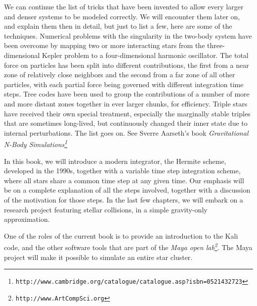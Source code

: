\documentclass{book}
\begin{document}
We can continue the list of tricks that have been invented to allow
every larger and denser systems to be modeled correctly.  We will
encounter them later on, and explain them then in detail, but just to
list a few, here are some of the techniques.  Numerical problems with
the singularity in the two-body system have been overcome by mapping
two or more interacting stars from the three-dimensional Kepler
problem to a four-dimensional harmonic oscillator.  The total force on
particles has been split into different contributions, the first from
a near zone of relatively close neighbors and the second from a far
zone of all other particles, with each partial force being governed
with different integration time steps.  Tree codes have been used to
group the contributions of a number of more and more distant zones
together in ever larger chunks, for efficiency.  Triple stars have
received their own special treatment, especially the marginally stable
triples that are sometimes long-lived, but continuously changed their
inner state due to internal perturbations.  The list goes on.  See
Sverre Aarseth's book
 {\it Gravitational
N-Body Simulations\footnote{\tt http://www.cambridge.org/catalogue/catalogue.asp?isbn=0521432723}}

In this book, we will introduce a modern integrator, the Hermite
scheme, developed in the 1990s, together with a variable time step
integration scheme, where all stars share a common time step at any
given time.  Our emphasis will be on a complete explanation of all the
steps involved, together with a discussion of the motivation for those
steps.  In the last few chapters, we will embark on a research project
featuring stellar collisions, in a simple gravity-only approximation.

One of the roles of the current book is to provide an introduction to
the Kali code, and the other software tools that are part of the
 {\it Maya open lab\footnote{\tt http://www.ArtCompSci.org}}.  The Maya project
will make it possible to simulate an entire star cluster.

    
\end{document}
